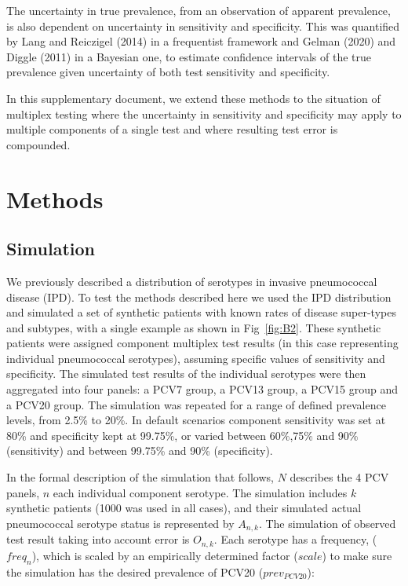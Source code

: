 \documentclass[a4paper, 12pt, twoside]{article}
\let\Oldsection\section
\renewcommand{\section}{\FloatBarrier\Oldsection}
\let\Oldsubsection\subsection
\renewcommand{\subsection}{\FloatBarrier\Oldsubsection}
\begin{document}
The uncertainty in true prevalence, from an observation of apparent prevalence, is also dependent on uncertainty in sensitivity and specificity. This was quantified by Lang and Reiczigel (2014)\cite{lang2014,flor2020} in a frequentist framework and Gelman (2020) and Diggle (2011) \cite{gelman2020,flor2020,diggle2011} in a Bayesian one, to estimate confidence intervals of the true prevalence given uncertainty of both test sensitivity and specificity.

In this supplementary document, we extend these methods to the situation of multiplex testing where the uncertainty in sensitivity and specificity may apply to multiple components of a single test and where resulting test error is compounded.

\section{Methods}
\subsection{Simulation}

We previously described a distribution of serotypes in invasive pneumococcal disease (IPD)\cite{hyams2023a}. To test the methods described here we used the IPD distribution and simulated a set of synthetic patients with known rates of disease super-types and subtypes, with a single example as shown in Fig~\ref{fig:B2}. These synthetic patients were assigned component multiplex test results (in this case representing individual pneumococcal serotypes), assuming specific values of sensitivity and specificity. The simulated test results of the individual serotypes were then aggregated into four panels: a PCV7 group, a PCV13 group, a PCV15 group and a PCV20 group. The simulation was repeated for a range of defined prevalence levels, from 2.5\% to 20\%. In default scenarios component sensitivity was set at 80\% and specificity kept at 99.75\%, or varied between 60\%,75\% and 90\% (sensitivity) and between 99.75\% and 90\% (specificity).

In the formal description of the simulation that follows, \(N\) describes the 4 PCV panels, \(n\) each individual component serotype. The simulation includes \(k\) synthetic patients (1000 was used in all cases), and their simulated actual pneumococcal serotype status is represented by \(A_{n,k}\). The simulation of observed test result taking into account error is \(O_{n,k}\). Each serotype has a frequency, (\(freq_n\)), which is scaled by an empirically determined factor (\(scale\)) to make sure the simulation has the desired prevalence of PCV20 (\(prev_{PCV20}\)):
\end{document}
